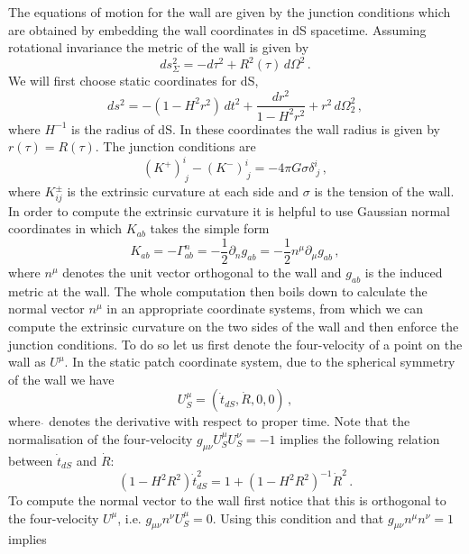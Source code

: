 \documentclass[a4paper,11pt]{article}
\numberwithin{equation}{section}
\newcommand{\be}{\begin{equation}}
\newcommand{\ee}{\end{equation}}
\begin{document}
The equations of motion for the wall are given by the junction conditions which are obtained by embedding the wall coordinates in dS spacetime. Assuming rotational invariance  the metric of the wall is given by
\be
ds^2_\Sigma=-d\tau^2+R^2(\tau)\, d\Omega^2 \,. \label{eq:wall_metric}
\ee
We will first choose static coordinates for  dS, 
\be
ds^2=-(1-H^2r^2)\, dt^2+\frac{dr^2}{1-H^2r^2}+r^2\, d\Omega_2^2 \,,
\ee
where $H^{-1}$ is the radius of dS. In these coordinates the wall radius is given by $r(\tau)=R(\tau)$. The junction conditions are 
\begin{equation}
(K^+)^{ i}_{\ j}-(K^-)^{ i}_{\ j}=-4\pi G \sigma\delta^{i}_{\ j} \,,
\end{equation}
where $K_{ij}^\pm$ is the extrinsic curvature at each side  and $\sigma$ is the tension of the wall. In order to compute the extrinsic curvature it is helpful to use Gaussian normal coordinates in which $K_{ab}$  takes the simple form
\begin{equation}
K_{ab} = - \Gamma^n_{ab} = - \frac{1}{2} \partial_n g_{ab} = -\frac{1}{2} n^\mu \partial_\mu g_{ab} \,,
\end{equation}
where $n^\mu$ denotes the unit vector orthogonal to the wall and $g_{ab}$ is the induced metric at the wall. The whole computation then boils down  to calculate the normal vector $n^\mu$ in an appropriate coordinate systems, from which we can compute the extrinsic curvature on the two sides of the wall and then enforce the junction conditions. To do so let us first denote the four-velocity of a point on the wall as $U^\mu$. In the static patch coordinate system, due to the spherical symmetry of the wall we have
\begin{equation}
U^\mu_S = \left(\dot{t}_{dS},\dot{R},0,0\right) \,,
\end{equation}
where $\dot{}$ denotes the derivative with respect to proper time. Note that the  normalisation of the four-velocity $g_{\mu \nu} U^\mu_S U^\nu_S = - 1$ implies the following relation between $\dot{t}_{dS}$ and $\dot{R}$:
\begin{equation}
\label{eq:TdRdS}
(1-H^2 R^2) \dot{t}_{dS}^2 = 1 +(1-H^2 R^2)^{-1} \dot{R}^2 \,.
\end{equation}
To compute the  normal vector to the wall  first notice that this is orthogonal to the four-velocity $U^\mu$, i.e. $g_{\mu \nu} n^\nu U^\mu_S = 0$. Using this  condition and that  $g_{\mu \nu} n^\mu n^\nu = 1$ implies
\end{document}
